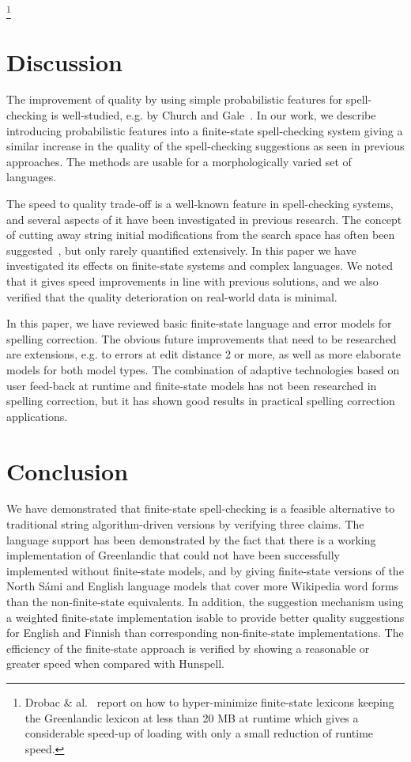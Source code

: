 \documentclass[postprint]{flammie}
\begin{document}
\footnote{Drobac \& al.~\cite{drobac2014heuristic} report on how to hyper-minimize finite-state lexicons keeping the Greenlandic lexicon at less than 20 MB at runtime which gives a considerable speed-up of loading
with only a small reduction of runtime speed.}

\section{Discussion}

The improvement of quality by using simple probabilistic features for
spell-checking is well-studied, e.g. by Church and
Gale~\cite{church1991probability}. In our work, we describe introducing
probabilistic features into a finite-state spell-checking system giving a
similar increase in the quality of the spell-checking suggestions as seen in
previous approaches.  The methods are usable for a morphologically varied set
of languages.

The speed to quality trade-off is a well-known feature in spell-checking
systems, and several aspects of it have been investigated in previous research.
The concept of cutting away string initial modifications from the search space
has often been suggested~\cite{bhagat2007spelling,kukich1992techniques}, but
only rarely quantified extensively. In this paper we have investigated its
effects on finite-state systems and complex languages. We noted that it gives
speed improvements in line with previous solutions, and we also verified that
the quality deterioration on real-world data is minimal.

In this paper, we have reviewed basic finite-state language and error models
for spelling correction. The obvious future improvements that need to be
researched are extensions, e.g. to errors at edit distance 2 or more, as well
as more elaborate models for both model types. The combination of adaptive
technologies based on user feed-back at runtime and finite-state models has
not been researched in spelling correction, but it has shown good results in
practical spelling correction applications.

\section{Conclusion}

We have demonstrated that finite-state spell-checking is a feasible alternative
to traditional string algorithm-driven versions by verifying three claims.
The language support has been demonstrated by the fact that there is a
working implementation of Greenlandic that could not have been successfully
implemented without finite-state models, and by giving finite-state versions of
the North Sámi and English language models that cover more Wikipedia word forms
than the non-finite-state equivalents.  In addition, the suggestion mechanism
using a weighted finite-state implementation isable to provide better quality
suggestions for English and Finnish than corresponding non-finite-state
implementations. The efficiency of the finite-state approach is verified by
showing a reasonable or greater speed when compared with Hunspell.
\end{document}
